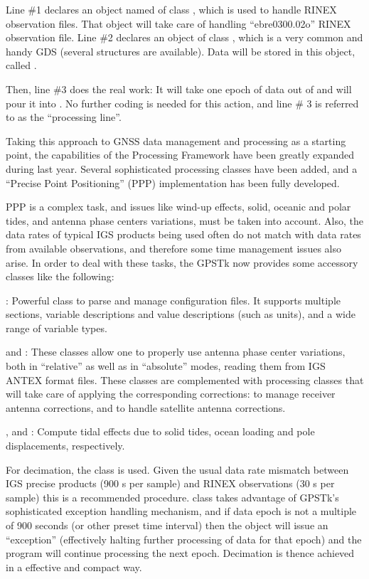 Line \#1 declares an object named  of class
, which is used to handle RINEX observation files.
That object will take care of handling ``ebre0300.02o'' RINEX observation file.
Line \#2 declares an object of class , which is a very
common and handy GDS (several structures are available). Data will be
stored in this object, called .

Then, line \#3 does the real work: It will take one epoch of data out of
 and will pour it into . No further coding is needed
for this action, and line \# 3 is referred to as the ``processing line''.

Taking this approach to GNSS data management and processing as a starting point,
the capabilities of the Processing Framework have been greatly expanded during
last year. Several sophisticated processing classes have been added, and a
``Precise Point Positioning'' (PPP) implementation \cite{ppp:kouba2001} has been
fully developed.

PPP is a complex task, and issues like wind-up effects, solid, oceanic and polar
tides, and antenna phase centers variations, must be taken into account. Also,
the data rates of typical IGS products being used often do not match with data
rates from available observations, and therefore some time management issues
also arise. In order to deal with these tasks, the GPSTk now provides some
accessory classes like the following:

: Powerful class to parse and manage configuration
files. It supports multiple sections, variable descriptions and value
descriptions (such as units), and a wide range of variable types.

 and : These classes allow one to
properly use antenna phase center variations, both in ``relative'' as well as in
``absolute'' modes, reading them from IGS ANTEX format files. These classes
are complemented with processing classes that will take care of applying the
corresponding corrections:  to manage receiver
antenna corrections, and  to handle satellite
antenna corrections.

,  and :
Compute tidal effects due to solid tides, ocean loading and pole
displacements, respectively.

For decimation, the  class is used. Given the usual data rate
mismatch between IGS precise products (900 s per sample) and RINEX observations
(30 s per sample) this is a recommended procedure.  class
takes advantage of GPSTk's sophisticated exception handling mechanism, and if data
epoch is not a multiple of 900 seconds (or other preset time interval) then the
 object will issue an ``exception'' (effectively halting
further processing of data for that epoch) and the program will continue
processing the next epoch. Decimation is thence achieved in a effective and
compact way.


